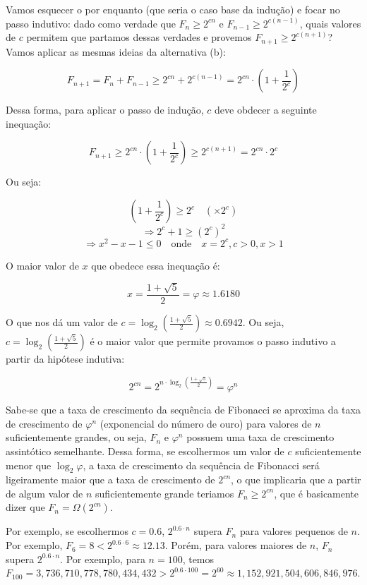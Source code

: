 \documentclass[12pt, a4paper]{article}
\begin{document}
Vamos esquecer o  por enquanto (que seria o caso base da indução) e focar no passo indutivo: dado como verdade que $F_n \geq 2^{cn}$ e $F_{n-1} \geq 2^{c(n-1)}$, quais valores de $c$ permitem que partamos dessas verdades e provemos $F_{n+1} \geq 2^{c(n+1)}$? Vamos aplicar as mesmas ideias da alternativa (b):

\[ F_{n+1} = F_n + F_{n-1} \geq 2^{cn} + 2^{c(n-1)} = 2^{cn} \cdot \left( 1 + \frac{1}{2^c} \right) \]

Dessa forma, para aplicar o passo de indução, $c$ deve obdecer a seguinte inequação:

\[ F_{n+1} \geq 2^{cn} \cdot \left( 1 + \frac{1}{2^c} \right) \geq 2^{c(n+1)} = 2^{cn} \cdot 2^c \]

Ou seja:

\[ \left( 1 + \frac{1}{2^c} \right) \geq 2^c \quad (\times 2^c) \]
\[ \Rightarrow 2^c + 1 \geq (2^c)^2 \]
\[ \Rightarrow x^2 - x - 1 \leq 0 \quad \textrm{onde} \quad x=2^c, c>0, x>1 \]

O maior valor de $x$ que obedece essa inequação é:

\[ x = \frac{1 + \sqrt{5}}{2} = \varphi \approx 1.6180 \]

O que nos dá um valor de $c=\log_{2}{(\frac{1 + \sqrt{5}}{2})} \approx 0.6942$. Ou seja, $c=\log_{2}{(\frac{1 + \sqrt{5}}{2})}$ é o maior valor que permite provamos o passo indutivo a partir da hipótese indutiva:

\[ 2^{cn} = 2^{n \cdot \log_{2}{(\frac{1 + \sqrt{5}}{2})}} = \varphi^{n} \]

Sabe-se que a taxa de crescimento da sequência de Fibonacci se aproxima da taxa de crescimento de $\varphi^n$ (exponencial do número de ouro) para valores de $n$ suficientemente grandes, ou seja, $F_n$ e $\varphi^n$ possuem uma taxa de crescimento assintótico semelhante. Dessa forma, se escolhermos um valor de $c$ suficientemente menor que $\log_2{\varphi}$, a taxa de crescimento da sequência de Fibonacci será ligeiramente maior que a taxa de crescimento de $2^{cn}$, o que implicaria que a partir de algum valor de $n$ suficientemente grande teriamos $F_n \geq 2^{cn}$, que é basicamente dizer que $F_n = \Omega(2^{cn})$.

Por exemplo, se escolhermos $c=0.6$, $2^{0.6 \cdot n}$ supera $F_n$ para valores pequenos de $n$. Por exemplo, $F_6 = 8 < 2^{0.6 \cdot 6} \approx 12.13$. Porém, para valores maiores de $n$, $F_n$ supera $2^{0.6 \cdot n}$. Por exemplo, para $n=100$, temos $F_{100} = 3,736,710,778,780,434,432 > 2^{0.6 \cdot 100} = 2^{60} \approx 1,152,921,504,606,846,976$.
\end{document}
